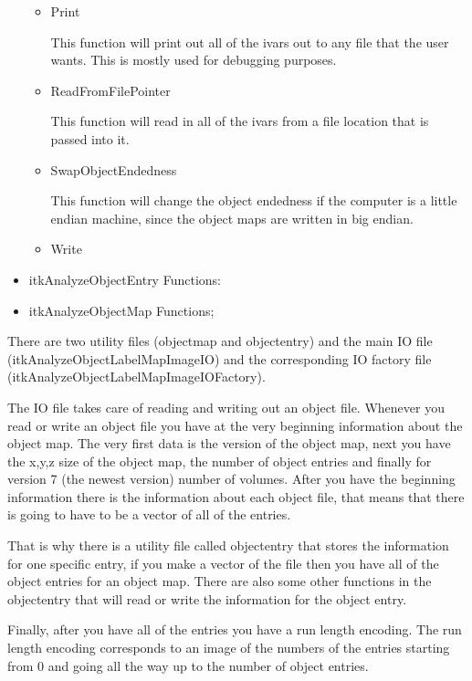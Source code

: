 \documentclass{InsightArticle}
\begin{document}
\begin{itemize}
\begin{itemize}
  \item Print

    This function will print out all of the ivars out to any file that the user wants.  This is mostly used for debugging purposes.

  \item ReadFromFilePointer
    
    This function will read in all of the ivars from a file location that is passed into it.

  \item SwapObjectEndedness

    This function will change the object endedness if the computer is a little endian machine, since the object maps are written in big endian.

  \item Write
\end{itemize}
\item itkAnalyzeObjectEntry
  Functions:
    

\item itkAnalyzeObjectMap
  Functions;
    
\end{itemize}

There are two utility files (objectmap and objectentry) and the main IO file (itkAnalyzeObjectLabelMapImageIO) and the corresponding
IO factory file (itkAnalyzeObjectLabelMapImageIOFactory).  

The IO file takes care of reading and writing out an object file.  Whenever
you read or write an object file you have at the very beginning information about the object map.  The very first data is the version
of the object map, next you have the x,y,z size of the object map, the number of object entries and finally for version 7 (the newest
version) number of volumes.  After you have the beginning information there is the information about each object file, that means that
there is going to have to be a vector of all of the entries.  

That is why there is a utility file called objectentry that stores the
information for one specific entry, if you make a vector of the file then you have all of the object entries for an object map.  There
are also some other functions in the objectentry that will read or write the information for the object entry.  

Finally, after you have all of the entries you have a run length encoding.  The run length encoding corresponds to an image of the numbers of the entries starting from 0 and going all the way up to the number of object entries.  
\end{document}
